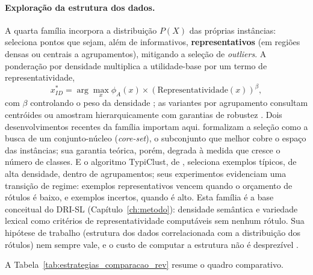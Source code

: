 \paragraph{Exploração da estrutura dos dados.} A quarta família incorpora a
distribuição $P(X)$ das próprias instâncias: seleciona pontos que sejam, além
de informativos, \textbf{representativos} (em regiões densas ou centrais a
agrupamentos), mitigando a seleção de \textit{outliers}. A ponderação por
densidade multiplica a utilidade-base por um termo de representatividade,
\begin{equation}
x^*_{ID} = \arg\max_x \phi_A(x) \times \left( \text{Representatividade}(x) \right)^\beta ,
\label{eq:id}
\end{equation}
com $\beta$ controlando o peso da densidade \citep{Settles2008}; as variantes
por agrupamento consultam centróides ou amostram hierarquicamente com
garantias de robustez \citep{Nguyen2004, Dasgupta2008}. Dois desenvolvimentos recentes da família importam aqui. \citet{Sener2018}
formalizam a seleção como a busca de um conjunto-núcleo (\textit{core-set}), o
subconjunto que melhor cobre o espaço das instâncias; sua garantia teórica,
porém, degrada à medida que cresce o número de classes. E o algoritmo
TypiClust, de \citet{Hacohen2022TypiClust}, seleciona exemplos típicos, de
alta densidade, dentro de agrupamentos; seus experimentos evidenciam uma
transição de regime: exemplos representativos vencem quando o orçamento de
rótulos é baixo, e exemplos incertos, quando é alto. Esta família é a base
conceitual do DRI-SL (Capítulo~\ref{ch:metodo}): densidade semântica e
variedade lexical como critérios de representatividade computáveis sem nenhum
rótulo. Sua hipótese de trabalho (estrutura dos dados correlacionada com a
distribuição dos rótulos) nem sempre vale, e o custo de computar a estrutura
não é desprezível \cite{Wertz2022}.

A Tabela~\ref{tab:estrategias_comparacao_rev} resume o quadro comparativo.

